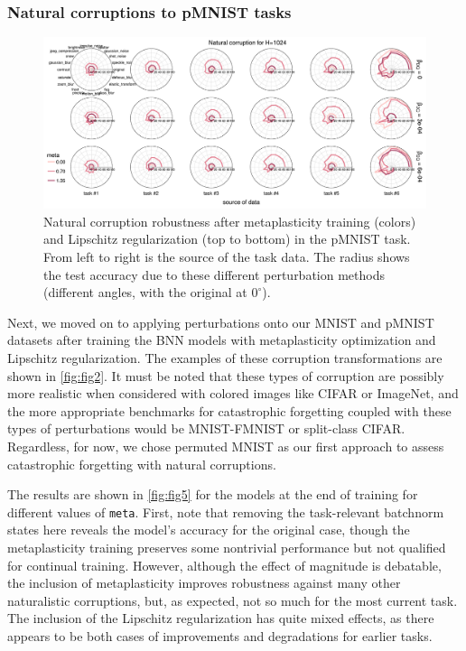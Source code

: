 \documentclass[manuscript,screen,review=false, nonacm]{acmart}
\begin{document}
\subsubsection{Natural corruptions to pMNIST tasks}

\begin{figure}[ht]
    \centering
    \includegraphics[width=1.1\textwidth]{figures/report/Fig5.pdf}
    \caption{
    Natural corruption robustness after metaplasticity training (colors) and Lipschitz regularization (top to bottom) in the pMNIST task. 
    From left to right is the source of the task data. 
    The radius shows the test accuracy due to these different perturbation methods (different angles, with the original at $0^{\circ}$).
    }
    \label{fig:fig5}
\end{figure}

Next, we moved on to applying perturbations onto our MNIST and pMNIST datasets after training the BNN models with metaplasticity optimization and Lipschitz regularization. The examples of these corruption transformations are shown in \autoref{fig:fig2}. It must be noted that these types of corruption are possibly more realistic when considered with colored images like CIFAR or ImageNet, and the more appropriate benchmarks for catastrophic forgetting coupled with these types of perturbations would be MNIST-FMNIST or split-class CIFAR. Regardless, for now, we chose permuted MNIST as our first approach to assess catastrophic forgetting with natural corruptions.

The results are shown in \autoref{fig:fig5} for the models at the end of training for different values of \texttt{meta}. First, note that removing the task-relevant batchnorm states here reveals the model's accuracy for the original case, though the metaplasticity training preserves some nontrivial performance but not qualified for continual training. However, although the effect of magnitude is debatable, the inclusion of metaplasticity improves robustness against many other naturalistic corruptions, but, as expected, not so much for the most current task. The inclusion of the Lipschitz regularization has quite mixed effects, as there appears to be both cases of improvements and degradations for earlier tasks. 
\end{document}
